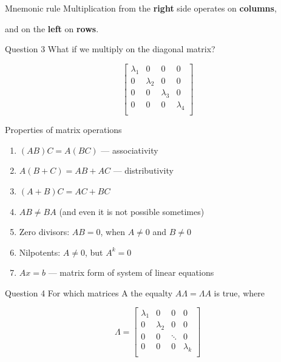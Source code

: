 \documentclass[fullscreen=true, bookmarks=true, hyperref={pdfencoding=unicode}]{beamer}
\begin{document}
\begin{frame}{Mnemonic rule}
  Multiplication from the \textbf{right} side operates on \textbf{columns}, 
  
  and on the \textbf{left} on \textbf{rows}.

  \pause
  \begin{block}{Question 3}
    What if we multiply on the diagonal matrix?

    \begin{equation*}
      \left[\begin{matrix}
        \lambda_1 & 0 & 0 & 0  \\
        0 & \lambda_2 & 0 & 0  \\
        0 & 0 & \lambda_3 & 0  \\
        0 & 0 & 0 & \lambda_4  \\
        \end{matrix}\right]
    \end{equation*}
  \end{block} 

\end{frame}


\begin{frame}{Properties of matrix operations}

  \begin{enumerate}
    \item $(AB)C = A(BC)$ — associativity
    \item $A(B+C) = AB+AC$ — distributivity
    \item $(A+B)C = AC+BC$
    \pause 
    \item $AB \neq BA$ (and even it is not possible sometimes)
    \pause 
    \item Zero divisors: $AB = 0$, when $A \neq 0$ and $B \neq 0$
    \item Nilpotents: $A \neq 0$, but $A^k = 0$
    \pause 
    \item $Ax=b$ — matrix form of system of linear equations
  \end{enumerate}

  \pause
  \begin{block}{Question 4}
    For which matrices A the equalty $A\Lambda = \Lambda A$ is true, where

  \begin{equation*}
    \Lambda = \left[\begin{matrix}
      \lambda_1 & 0 & 0 & 0  \\
      0 & \lambda_2 & 0 & 0  \\
      0 & 0 & \ddots & 0     \\
      0 & 0 & 0 & \lambda_k  \\
      \end{matrix}\right]
  \end{equation*}
  \end{block} 
\end{frame}
\end{document}
